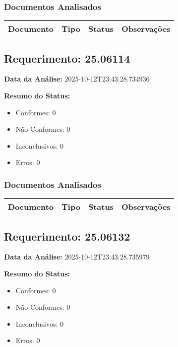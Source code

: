 \documentclass[12pt,a4paper]{article}
\begin{document}
\subsubsection{Documentos Analisados}

\begin{longtable}{|p{4cm}|p{2cm}|p{2cm}|p{6cm}|}
\hline
\textbf{Documento} & \textbf{Tipo} & \textbf{Status} & \textbf{Observações} \\
\hline
\endhead
\end{longtable}


\subsection{Requerimento: 25.06114}

\textbf{Data da Análise:} 2025-10-12T23:43:28.734936

\textbf{Resumo do Status:}
\begin{itemize}
    \item Conformes: 0
    \item Não Conformes: 0
    \item Inconclusivos: 0
    \item Erros: 0
\end{itemize}

\subsubsection{Documentos Analisados}

\begin{longtable}{|p{4cm}|p{2cm}|p{2cm}|p{6cm}|}
\hline
\textbf{Documento} & \textbf{Tipo} & \textbf{Status} & \textbf{Observações} \\
\hline
\endhead
\end{longtable}


\subsection{Requerimento: 25.06132}

\textbf{Data da Análise:} 2025-10-12T23:43:28.735979

\textbf{Resumo do Status:}
\begin{itemize}
    \item Conformes: 0
    \item Não Conformes: 0
    \item Inconclusivos: 0
    \item Erros: 0
\end{itemize}
\end{document}
